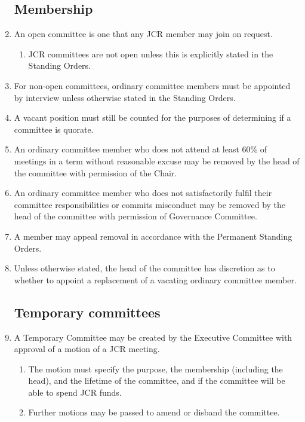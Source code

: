\documentclass[12pt]{article}
\begin{document}
\begin{enumerate}
    \subsection{Membership}
    \item An open committee is one that any JCR member may join on request.
    \begin{enumerate}
        \item JCR committees are not open unless this is explicitly stated in the Standing Orders.
    \end{enumerate}
    \item For non-open committees, ordinary committee members must be appointed by interview unless otherwise stated in the Standing Orders.
    \item \label{vacant-quorum}A vacant position must still be counted for the purposes of determining if a committee is quorate.
    \item An ordinary committee member who does not attend at least 60\% of meetings in a term without reasonable excuse may be removed by the head of the committee with permission of the Chair.
    \item An ordinary committee member who does not satisfactorily fulfil their committee responsibilities or commits misconduct may be removed by the head of the committee with permission of Governance Committee.
    \item A member may appeal removal in accordance with the Permanent Standing Orders.
    \item Unless otherwise stated, the head of the committee has discretion as to whether to appoint a replacement of a vacating ordinary committee member.
    \subsection{Temporary committees}
    \item A Temporary Committee may be created by the Executive Committee with approval of a motion of a JCR meeting.
    \begin{enumerate}
        \item The motion must specify the purpose, the membership (including the head), and the lifetime of the committee, and if the committee will be able to spend JCR funds.
        \item Further motions may be passed to amend or disband the committee.
    \end{enumerate}
\end{enumerate}
\end{document}
